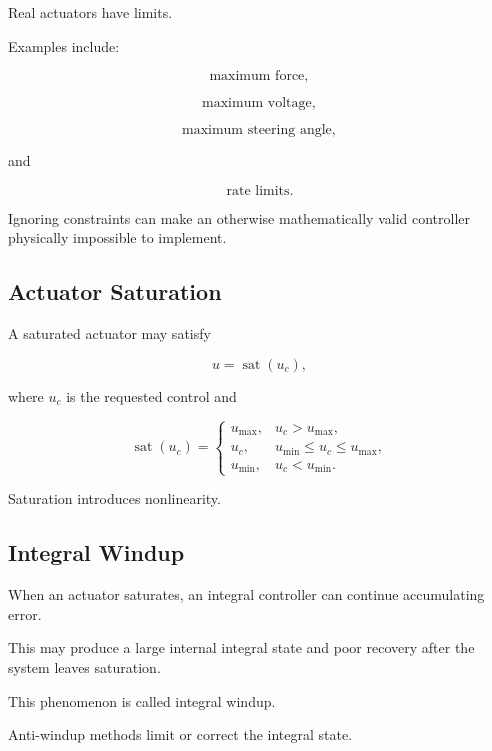 Real actuators have limits.

Examples include:

\[
\boxed{
\text{maximum force},
}
\]

\[
\boxed{
\text{maximum voltage},
}
\]

\[
\boxed{
\text{maximum steering angle},
}
\]

and

\[
\boxed{
\text{rate limits}.
}
\]

Ignoring constraints can make an otherwise mathematically valid controller
physically impossible to implement.

\subsection{Actuator Saturation}
\label{subsec:actuator-saturation}

A saturated actuator may satisfy

\[
\boxed{
u
=
\operatorname{sat}(u_c),
}
\]

where \(u_c\) is the requested control and

\[
\operatorname{sat}(u_c)
=
\begin{cases}
u_{\max}, & u_c>u_{\max},\\
u_c, & u_{\min}\leq u_c\leq u_{\max},\\
u_{\min}, & u_c<u_{\min}.
\end{cases}
\]

Saturation introduces nonlinearity.

\subsection{Integral Windup}
\label{subsec:integral-windup}

When an actuator saturates, an integral controller can continue accumulating
error.

This may produce a large internal integral state and poor recovery after the
system leaves saturation.

This phenomenon is called integral windup.

Anti-windup methods limit or correct the integral state.


